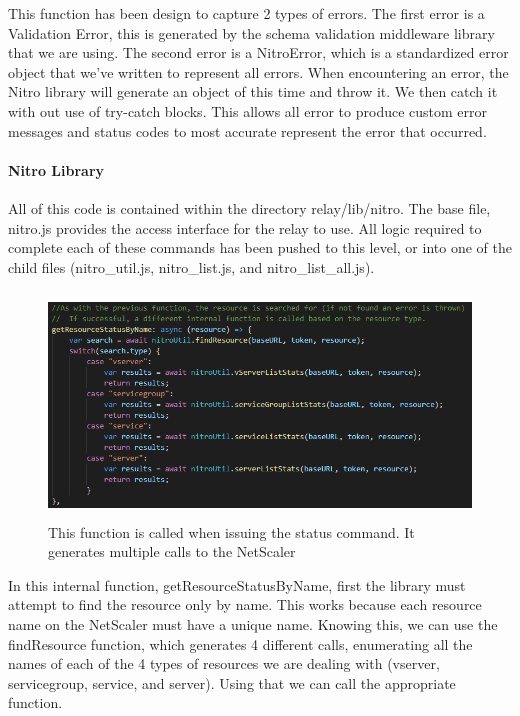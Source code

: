\documentclass[onecolumn, draftclsnofoot,10pt, compsoc]{IEEEtran}
\begin{document}
    This function has been design to capture 2 types of errors.
    The first error is a Validation Error, this is generated by the schema validation middleware library that we are using.
    The second error is a NitroError, which is a standardized error object that we've written to represent all errors.
    When encountering an error, the Nitro library will generate an object of this time and throw it.
    We then catch it with out use of try-catch blocks.
    This allows all error to produce custom error messages and status codes to most accurate represent the error that occurred.
    
    \paragraph{Nitro Library}
    All of this code is contained within the directory relay/lib/nitro.
    The base file, nitro.js provides the access interface for the relay to use.
    All logic required to complete each of these commands has been pushed to this level, or into one of the child files (nitro\_util.js, nitro\_list.js, and nitro\_list\_all.js).
    
    \begin{figure}[ht]
        \centering
        \includegraphics[height=6cm]{code10.png}
        \caption[Get Resource Status]{This function is called when issuing the status command. It generates multiple calls to the NetScaler}
        \label{fig:Get Resource Status}
    \end{figure}
    
    In this internal function, getResourceStatusByName, first the library must attempt to find the resource only by name.
    This works because each resource name on the NetScaler must have a unique name.
    Knowing this, we can use the findResource function, which generates 4 different calls, enumerating all the names of each of the 4 types of resources we are dealing with (vserver, servicegroup, service, and server).
    Using that we can call the appropriate function.
    
\end{document}

